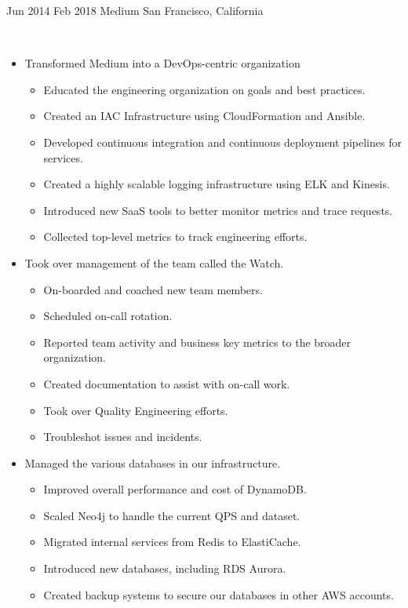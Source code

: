\documentclass[]{cv-style}          %
\begin{document}
\begin{entrylist}
\entry
{Jun 2014 \newline 
Feb 2018}
{Medium}
{San Francisco, California}
{\\
\begin{itemize}
\item Transformed Medium into a DevOps-centric organization
\begin{itemize}
\item Educated the engineering organization on goals and best practices.
\item Created an IAC Infrastructure using CloudFormation and Ansible.
\item Developed continuous integration and continuous deployment pipelines for services.
\item Created a highly scalable logging infrastructure using ELK and Kinesis.
\item Introduced new SaaS tools to better monitor metrics and trace requests.
\item Collected top-level metrics to track engineering efforts.
\end{itemize}
\item Took over management of the team called the Watch.
\begin{itemize}
\item On-boarded and coached new team members.
\item Scheduled on-call rotation.
\item Reported team activity and business key metrics to the broader organization.
\item Created documentation to assist with on-call work.
\item Took over Quality Engineering efforts.
\item Troubleshot issues and incidents.
\end{itemize}
\item Managed the various databases in our infrastructure.
\begin{itemize}
\item Improved overall performance and cost of DynamoDB.
\item Scaled Neo4j to handle the current QPS and dataset.
\item Migrated internal services from Redis to ElastiCache.
\item Introduced new databases, including RDS Aurora.
\item Created backup systems to secure our databases in other AWS accounts.

\end{itemize}
\end{itemize}}
\end{entrylist}
\end{document}
